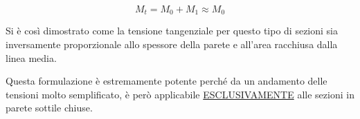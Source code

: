 		\[M_t = M_0 + M_1 \approx M_0\]
		
		Si è così dimostrato come la tensione tangenziale per questo tipo di sezioni sia inversamente proporzionale allo spessore della parete e all'area racchiusa dalla linea media. \newline 
		
		Questa formulazione è estremamente potente perché da un andamento delle tensioni molto semplificato, è però applicabile \underline{ESCLUSIVAMENTE} alle sezioni in parete sottile chiuse. 
